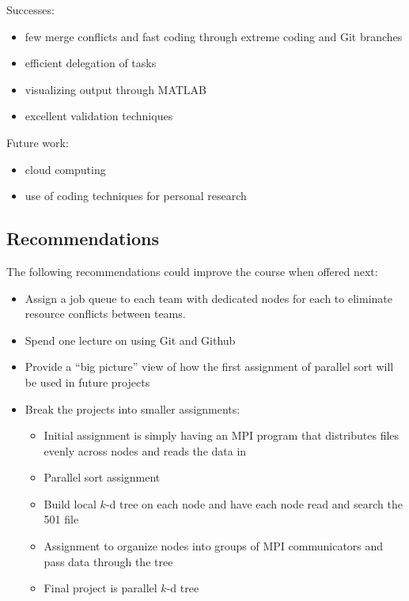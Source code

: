 \documentclass{article}
\begin{document}
\medskip

\begin{minipage}{\linewidth}
\begin{mdframed}[backgroundcolor=green!20]
	Successes:
	\begin{itemize}
		\item few merge conflicts and fast coding through extreme coding and Git branches
		\item efficient delegation of tasks
		\item visualizing output through MATLAB
		\item excellent validation techniques
	\end{itemize}
\end{mdframed}
\end{minipage}

\medskip

\begin{minipage}{\linewidth}
\begin{mdframed}[backgroundcolor=blue!20]
	Future work:
	\begin{itemize}
		\item cloud computing
		\item use of coding techniques for personal research
	\end{itemize}
\end{mdframed}
\end{minipage}

\medskip

%
%

\subsection{Recommendations}

The following recommendations could improve the course when offered next:

\begin{itemize}
    \item Assign a job queue to each team with dedicated nodes for each to eliminate resource conflicts between teams.
    \item Spend one lecture on using Git and Github
    \item Provide a ``big picture'' view of how the first assignment of parallel sort will be used in future projects
    \item Break the projects into smaller assignments:
        \begin{itemize}
            \item Initial assignment is simply having an MPI program that distributes files evenly across nodes and reads the data in
            \item Parallel sort assignment
            \item Build local $k$-d tree on each node and have each node read and search the 501 file
            \item Assignment to organize nodes into groups of MPI communicators and pass data through the tree
            \item Final project is parallel $k$-d tree
        \end{itemize}
\end{itemize}
\end{document}

